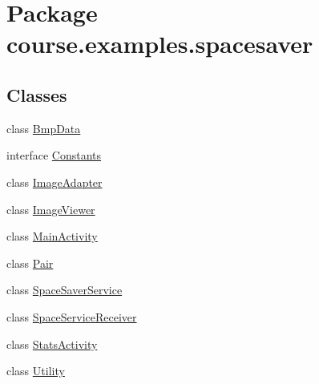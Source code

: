 \hypertarget{namespacecourse_1_1examples_1_1spacesaver}{}\section{Package course.\+examples.\+spacesaver}
\label{namespacecourse_1_1examples_1_1spacesaver}
\subsection*{Classes}
\begin{DoxyCompactItemize}
\item 
class \hyperlink{classcourse_1_1examples_1_1spacesaver_1_1_bmp_data}{Bmp\+Data}
\item 
interface \hyperlink{interfacecourse_1_1examples_1_1spacesaver_1_1_constants}{Constants}
\item 
class \hyperlink{classcourse_1_1examples_1_1spacesaver_1_1_image_adapter}{Image\+Adapter}
\item 
class \hyperlink{classcourse_1_1examples_1_1spacesaver_1_1_image_viewer}{Image\+Viewer}
\item 
class \hyperlink{classcourse_1_1examples_1_1spacesaver_1_1_main_activity}{Main\+Activity}
\item 
class \hyperlink{classcourse_1_1examples_1_1spacesaver_1_1_pair}{Pair}
\item 
class \hyperlink{classcourse_1_1examples_1_1spacesaver_1_1_space_saver_service}{Space\+Saver\+Service}
\item 
class \hyperlink{classcourse_1_1examples_1_1spacesaver_1_1_space_service_receiver}{Space\+Service\+Receiver}
\item 
class \hyperlink{classcourse_1_1examples_1_1spacesaver_1_1_stats_activity}{Stats\+Activity}
\item 
class \hyperlink{classcourse_1_1examples_1_1spacesaver_1_1_utility}{Utility}
\end{DoxyCompactItemize}

